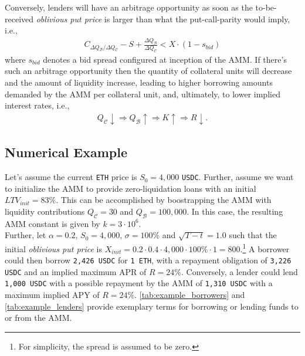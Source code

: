 \documentclass[a4paper]{article}
\begin{document}
Conversely, lenders will have an arbitrage opportunity as soon as the to-be-received \emph{oblivious put price} is larger than what the put-call-parity would imply, i.e.,
\begin{equation}
\label{eq:option_premium_lenders}
\begin{split}
C_{\Delta Q_\mathcal{B} / \Delta Q_\mathcal{C}} - S + \frac{\Delta Q_\mathcal{B}}{\Delta Q_\mathcal{C}} < X \cdot (1-s_{bid})
\end{split}
\end{equation}
where $s_{bid}$ denotes a bid spread configured at inception of the AMM. If there's such an arbitrage opportunity then the quantity of collateral units will decrease and the amount of liquidity increase, leading to higher borrowing amounts demanded by the AMM per collateral unit, and, ultimately, to lower implied interest rates, i.e.,
\begin{equation}
\begin{split}
Q_\mathcal{C}\downarrow \Rightarrow Q_\mathcal{B}\uparrow \Rightarrow K\uparrow \Rightarrow R\downarrow.
\end{split}
\end{equation}


\subsection{Numerical Example}
Let's assume the current \verb|ETH| price is $S_0=4,000$ \verb|USDC|. Further, assume we want to initialize the AMM to provide zero-liquidation loans with an initial $LTV_{init}=83\%$. This can be accomplished by boostrapping the AMM with liquidity contributions $Q_\mathcal{C}=30$ and $Q_\mathcal{B}=100,000$. In this case, the resulting AMM constant is given by $k=3\cdot10^6$.\\

Further, let $\alpha=0.2$, $S_0=4,000$, $\sigma=100\%$ and $\sqrt{T-t}=1.0$ such that the initial \emph{oblivious put price} is $X_{init} = 0.2 \cdot 0.4 \cdot 4,000 \cdot 100\% \cdot 1 = 800$.\footnote{For simplicity, the spread is assumed to be zero.} A borrower could then borrow \verb|2,426 USDC| for \verb|1 ETH|, with a repayment obligation of \verb|3,226 USDC| and an implied maximum APR of $R=24\%$. Conversely, a lender could lend \verb|1,000 USDC| with a possible repayment by the AMM of \verb|1,310 USDC| with a maximum implied APY of $R=24\%$. \cref{tab:example_borrowers} and \cref{tab:example_lenders} provide exemplary terms for borrowing or lending funds to or from the AMM.
\end{document}
